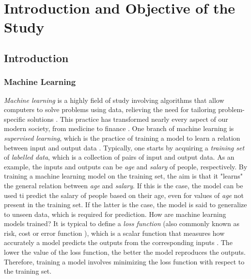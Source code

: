 \chapter{Introduction and Objective of the Study}

\section{Introduction}\label{sec:Introduction}

\subsection{Machine Learning}\label{sec:Machine Learning Intro}


\emph{Machine learning} is a highly field of study involving algorithms that allow computers to solve problems using data, relieving the need for tailoring problem-specific solutions \cite{SupervisedwquantumComputers}. This practice has transformed nearly every aspect of our modern society, from medicine \cite{medicine} to finance \cite{finance}. One branch of machine learning is \emph{supervised learning}, which is the practice of training a model to learn a relation between input and output data \cite{hastie01statisticallearning}. Typically, one starts by acquiring a \emph{training set} of \emph{labelled data}, which is a collection of pairs of input and output data. As an example, the inputs and outputs can be \emph{age} and \emph{salary} of people, respectively. By training a machine learning model on the training set, the aim is that it "learns" the general relation between \emph{age} and \emph{salary}. If this is the case, the model can be used ti predict the salary of people based on their age, even for values of \emph{age} not present in the training set. If the latter is the case, the model is said to generalize to unseen data, which is required for prediction. How are machine learning models trained? It is typical to define a \emph{loss function} (also commonly known as risk, cost or error function \citet{}), which is a scalar function that measures how accurately a model predicts the outputs from the corresponding inputs \cite{hastie01statisticallearning}. The lower the value of the loss function, the better the model reproduces the outputs. Therefore, training a model involves minimizing the loss function with respect to the training set.

